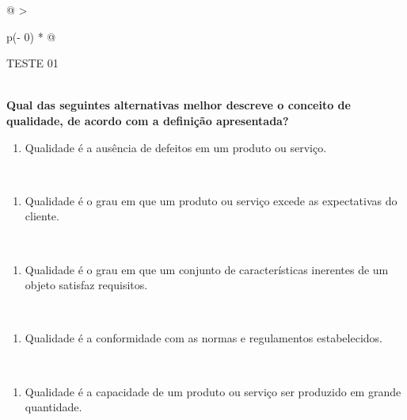 \documentclass[
]{book}
\providecommand{\tightlist}{%
  \setlength{\itemsep}{0pt}\setlength{\parskip}{0pt}}
\begin{document}
\begin{longtable}[]{@{}
  >{\raggedright\arraybackslash}p{(\columnwidth - 0\tabcolsep) * }@{}}
\toprule\noalign{}
\begin{minipage}[b]{\linewidth}\raggedright
TESTE 01
\end{minipage} \\
\midrule\noalign{}
\endhead
\bottomrule\noalign{}
\endlastfoot
\textbf{Qual das seguintes alternativas melhor descreve o conceito de qualidade, de acordo com a definição apresentada?} \\
\begin{minipage}[t]{\linewidth}\raggedright
\begin{enumerate}
\def\labelenumi{\alph{enumi})}
\tightlist
\item
  Qualidade é a ausência de defeitos em um produto ou serviço.
\end{enumerate}
\end{minipage} \\
\begin{minipage}[t]{\linewidth}\raggedright
\begin{enumerate}
\def\labelenumi{\alph{enumi})}
\setcounter{enumi}{1}
\tightlist
\item
  Qualidade é o grau em que um produto ou serviço excede as expectativas do cliente.
\end{enumerate}
\end{minipage} \\
\begin{minipage}[t]{\linewidth}\raggedright
\begin{enumerate}
\def\labelenumi{\alph{enumi})}
\setcounter{enumi}{2}
\tightlist
\item
  Qualidade é o grau em que um conjunto de características inerentes de um objeto satisfaz requisitos.
\end{enumerate}
\end{minipage} \\
\begin{minipage}[t]{\linewidth}\raggedright
\begin{enumerate}
\def\labelenumi{\alph{enumi})}
\setcounter{enumi}{3}
\tightlist
\item
  Qualidade é a conformidade com as normas e regulamentos estabelecidos.
\end{enumerate}
\end{minipage} \\
\begin{minipage}[t]{\linewidth}\raggedright
\begin{enumerate}
\def\labelenumi{\alph{enumi})}
\setcounter{enumi}{4}
\tightlist
\item
  Qualidade é a capacidade de um produto ou serviço ser produzido em grande quantidade.
\end{enumerate}
\end{minipage} \\
\end{longtable}
\end{document}
